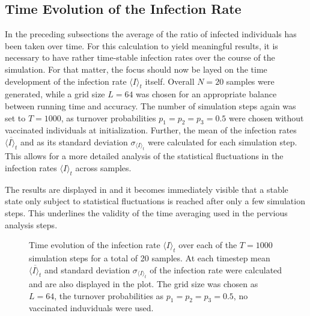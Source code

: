 \subsection{Time Evolution of the Infection Rate}

In the preceding subsections the average of the ratio of infected individuals has been taken over time. For this calculation to yield meaningful results, it is necessary to have
rather time-stable infection rates over the course of the simulation. For that matter, the focus should now be layed on the time development of the infection rate $\langle I\rangle_t$ itself.
Overall $N=20$ samples were generated, while a grid size $L=64$ was chosen for an appropriate balance between running time and accuracy. The number of simulation steps again was set to $T=1000$,
as turnover probabilities $p_1=p_2=p_3=0.5$ were chosen without vaccinated individuals at initialization. 
Further, the mean of the infection rates $\overline{\langle I\rangle_t}$ and as its standard deviation $\sigma_{\langle I\rangle_t}$ were calculated for each simulation step. 
This allows for a more detailed analysis of the statistical fluctuations in the infection rates $\langle I\rangle_t$ across samples. 

The results are displayed in  and it becomes immediately visible that a stable state only subject to statistical fluctuations is reached after only a few simulation steps.
This underlines the validity of the time averaging used in the pervious analysis steps.


\begin{figure}[ht]
    \centering
    \resizebox{\textwidth}{!}{}
    \caption{Time evolution of the infection rate $\langle I\rangle_t$ over each of the $T=1000$ simulation steps for a total of 20 samples. At each timestep mean $\overline{\langle I\rangle_t}$
    and standard deviation $\sigma_{\langle I\rangle_t}$ of the infection rate were calculated and are also displayed in the plot. The grid size was chosen as $L=64$, the turnover probabilities
    as $p_1=p_2=p_3=0.5$, no vaccinated induviduals were used.}\label{fig:res_dis_avg_inf_over_t}
\end{figure}
